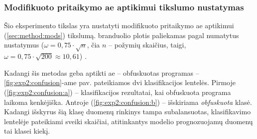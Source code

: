 \subsubsection{Modifikuoto \LIME pritaikymo \gls{ae} aptikimui tikslumo nustatymas}\label{sec:exp:2}

Šio eksperimento tikslas yra nustatyti modifikuoto \LIME pritaikymo \gls{ae} aptikimui (\ref{sec:method:mods}) tikslumą. \LIME branduolio plotis paliekamas pagal numatytus nustatymus ($\omega = 0,75 \cdot \sqrt{n}$, čia $n$ -- požymių skaičius, taigi, $\omega = 0,75 \cdot \sqrt{200} \approx 10,61$) \cite{ribeiroWhyShouldTrust2016}.

Kadangi šis metodas geba aptikti \gls{ae} -- obfuskuotas programas --
\ref{fig:exp2:confusion}-ame pav. pateikiamos dvi klasifikacijos lentelės. Pirmoje (\ref{fig:exp2:confusion:a}) -- klasifikacijos rezultatai, kai obfuskuota programa laikoma kenkėjiška. Antroje (\ref{fig:exp2:confusion:b}) -- išskiriama \textit{obfuskuota} klasė. Kadangi išskyrus šią klasę duomenų rinkinys tampa subalansuotas, klasifikavimo lentelėje pateikiami sveiki skaičiai, atitinkantys modelio prognozuojamų duomenų tai klasei kiekį.

